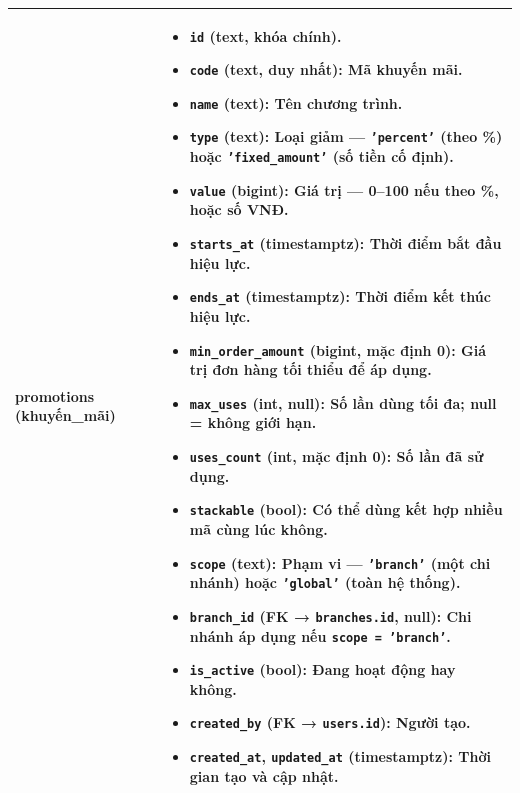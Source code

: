 \begin{longtable}{|>{\centering\arraybackslash}m{4.5cm}|>{\raggedright\arraybackslash}m{11.5cm}|}
\textbf{promotions} \newline (khuyến\_mãi) &
\begin{itemize}
    \item \texttt{id} (text, khóa chính).
    \item \texttt{code} (text, duy nhất): Mã khuyến mãi.
    \item \texttt{name} (text): Tên chương trình.
    \item \texttt{type} (text): Loại giảm — \texttt{'percent'} (theo \%) hoặc \texttt{'fixed\_amount'} (số tiền cố định).
    \item \texttt{value} (bigint): Giá trị — 0–100 nếu theo \%, hoặc số VNĐ.
    \item \texttt{starts\_at} (timestamptz): Thời điểm bắt đầu hiệu lực.
    \item \texttt{ends\_at} (timestamptz): Thời điểm kết thúc hiệu lực.
    \item \texttt{min\_order\_amount} (bigint, mặc định 0): Giá trị đơn hàng tối thiểu để áp dụng.
    \item \texttt{max\_uses} (int, null): Số lần dùng tối đa; null = không giới hạn.
    \item \texttt{uses\_count} (int, mặc định 0): Số lần đã sử dụng.
    \item \texttt{stackable} (bool): Có thể dùng kết hợp nhiều mã cùng lúc không.
    \item \texttt{scope} (text): Phạm vi — \texttt{'branch'} (một chi nhánh) hoặc \texttt{'global'} (toàn hệ thống).
    \item \texttt{branch\_id} (FK → \texttt{branches.id}, null): Chi nhánh áp dụng nếu \texttt{scope = 'branch'}.
    \item \texttt{is\_active} (bool): Đang hoạt động hay không.
    \item \texttt{created\_by} (FK → \texttt{users.id}): Người tạo.
    \item \texttt{created\_at}, \texttt{updated\_at} (timestamptz): Thời gian tạo và cập nhật.
\end{itemize} \\ \hline


\end{longtable}
